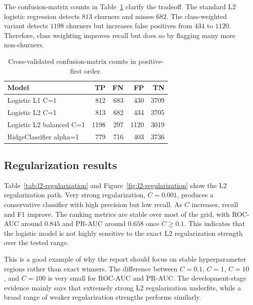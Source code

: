 The confusion-matrix counts in Table~\ref{tab:linear-confusion} clarify the tradeoff. The standard L2 logistic regression detects \(813\) churners and misses \(682\). The class-weighted variant detects \(1198\) churners but increases false positives from \(434\) to \(1120\). Therefore, class weighting improves recall but does so by flagging many more non-churners.

\begin{table}[H]
\centering
\begin{tabular}{lrrrr}
\toprule
Model & TP & FN & FP & TN \\
\midrule
Logistic L1 C=1 & 812 & 683 & 430 & 3709 \\
Logistic L2 C=1 & 813 & 682 & 434 & 3705 \\
Logistic L2 balanced C=1 & 1198 & 297 & 1120 & 3019 \\
RidgeClassifier alpha=1 & 779 & 716 & 403 & 3736 \\
\bottomrule
\end{tabular}
\caption{Cross-validated confusion-matrix counts in positive-first order.}
\label{tab:linear-confusion}
\end{table}

\subsection{Regularization results}

Table~\ref{tab:l2-regularization} and Figure~\ref{fig:l2-regularization} show the L2 regularization path. Very strong regularization, \(C=0.001\), produces a conservative classifier with high precision but low recall. As \(C\) increases, recall and F1 improve. The ranking metrics are stable over most of the grid, with ROC-AUC around \(0.845\) and PR-AUC around \(0.658\) once \(C\geq 0.1\). This indicates that the logistic model is not highly sensitive to the exact L2 regularization strength over the tested range.

This is a good example of why the report should focus on stable hyperparameter regions rather than exact winners. The difference between \(C=0.1\), \(C=1\), \(C=10\), and \(C=100\) is very small for ROC-AUC and PR-AUC. The development-stage evidence mainly says that extremely strong L2 regularization underfits, while a broad range of weaker regularization strengths performs similarly.

